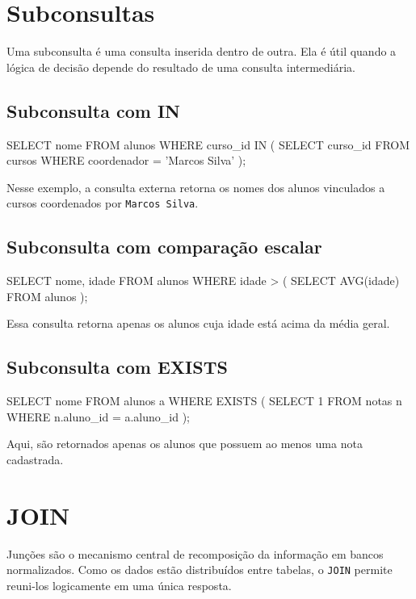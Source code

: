\section{Subconsultas}

Uma subconsulta é uma consulta inserida dentro de outra. Ela é útil quando a lógica de decisão depende do resultado de uma consulta intermediária.

\subsection{Subconsulta com IN}

\begin{sqlcode}
SELECT nome
FROM alunos
WHERE curso_id IN (
    SELECT curso_id
    FROM cursos
    WHERE coordenador = 'Marcos Silva'
);
\end{sqlcode}

Nesse exemplo, a consulta externa retorna os nomes dos alunos vinculados a cursos coordenados por \texttt{Marcos Silva}.

\subsection{Subconsulta com comparação escalar}

\begin{sqlcode}
SELECT nome, idade
FROM alunos
WHERE idade > (
    SELECT AVG(idade)
    FROM alunos
);
\end{sqlcode}

Essa consulta retorna apenas os alunos cuja idade está acima da média geral.

\subsection{Subconsulta com EXISTS}

\begin{sqlcode}
SELECT nome
FROM alunos a
WHERE EXISTS (
    SELECT 1
    FROM notas n
    WHERE n.aluno_id = a.aluno_id
);
\end{sqlcode}

Aqui, são retornados apenas os alunos que possuem ao menos uma nota cadastrada.

\section{JOIN}

Junções são o mecanismo central de recomposição da informação em bancos normalizados. Como os dados estão distribuídos entre tabelas, o \texttt{JOIN} permite reuni-los logicamente em uma única resposta.

